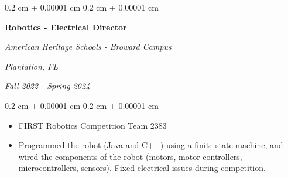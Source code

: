 \documentclass[10pt, letterpaper]{article}
\newenvironment{highlights}{
    \begin{itemize}[
        topsep=0.10 cm,
        parsep=0.10 cm,
        partopsep=0pt,
        itemsep=0pt,
        leftmargin=0.4 cm + 10pt
    ]
}{
    \end{itemize}
} %
\newenvironment{onecolentry}{
    \begin{adjustwidth}{
        0.2 cm + 0.00001 cm
    }{
        0.2 cm + 0.00001 cm
    }
}{
    \end{adjustwidth}
} %
\newenvironment{twocolentry}[2][]{
    \onecolentry
    \def\secondColumn{#2}
    \setcolumnwidth{\fill, 4.5 cm}
    \begin{paracol}{2}
}{
    \switchcolumn \raggedleft \secondColumn
    \end{paracol}
    \endonecolentry
} %
\let\hrefWithoutArrow\href
\renewcommand{\href}[2]{\hrefWithoutArrow{#1}{\ifthenelse{\equal{#2}{}}{ }{#2 }\raisebox{.15ex}{\footnotesize \faExternalLink*}}}
\begin{document}
        \vspace{0.2 cm}

        \begin{twocolentry}{
        \textit{Plantation, FL}    
            
        \textit{Fall 2022 - Spring 2024}}
            \textbf{Robotics - Electrical Director}
            
            \textit{American Heritage Schools - Broward Campus}
        \end{twocolentry}

        \vspace{0.10 cm}
        \begin{onecolentry}
            \begin{highlights}
                \item FIRST Robotics Competition Team 2383 
                \item Programmed the robot (Java and C++) using a finite state machine, and wired the components of the robot (motors, motor controllers, microcontrollers, sensors). Fixed electrical issues during competition. 
            \end{highlights}
        \end{onecolentry}




        





\end{document}
